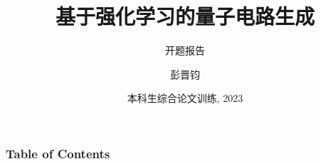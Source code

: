 \documentclass{beamer}
\title[About Beamer] %
{基于强化学习的量子电路生成}
\subtitle{开题报告}
\author[] %
{彭晋钧\inst{1}}
\institute[VFU] %
{
  \inst{1}%
  计算机科学与技术系\\
  清华大学
}
\date[2023] %
{本科生综合论文训练, 2023}
\begin{document}
\begin{CJK}{UTF8}{gbsn}

\frame{\titlepage}


\begin{frame}
\frametitle{Table of Contents}
\tableofcontents
\end{frame}






\end{CJK}
\end{document}
